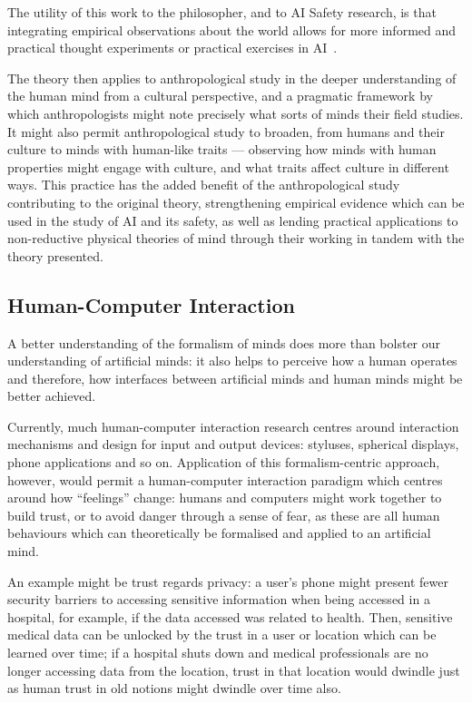 The utility of this work to the philosopher, and to AI Safety research, is that integrating empirical observations about the world allows for more informed and practical thought experiments or practical exercises in AI~. \par

The theory then applies to anthropological study in the deeper understanding of the human mind from a cultural perspective, and a pragmatic framework by which anthropologists might note precisely what sorts of minds their field studies. It might also permit anthropological study to broaden, from humans and their culture to minds with human-like traits --- observing how minds with human properties might engage with culture, and what traits affect culture in different ways. This practice has the added benefit of the anthropological study contributing to the original theory, strengthening empirical evidence which can be used in the study of AI and its safety, as well as lending practical applications to non-reductive physical theories of mind through their working in tandem with the theory presented.\par

\subsection{Human-Computer Interaction} %
A better understanding of the formalism of minds does more than bolster our understanding of artificial minds: it also helps to perceive how a human operates and therefore, how interfaces between artificial minds and human minds might be better achieved.\par

Currently, much human-computer interaction research centres around interaction mechanisms and design for input and output devices: styluses, spherical displays, phone applications and so on. Application of this formalism-centric approach, however, would permit a human-computer interaction paradigm which centres around how ``feelings'' change: humans and computers might work together to build trust, or to avoid danger through a sense of fear, as these are all human behaviours which can theoretically be formalised and applied to an artificial mind.\par

An example might be trust regards privacy: a user's phone might present fewer security barriers to accessing sensitive information when being accessed in a hospital, for example, if the data accessed was related to health. Then, sensitive medical data can be unlocked by the trust in a user or location which can be learned over time; if a hospital shuts down and medical professionals are no longer accessing data from the location, trust in that location would dwindle just as human trust in old notions might dwindle over time also.\par

